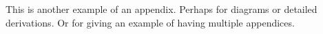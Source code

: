 This is another example of an appendix.
Perhaps for diagrams or detailed derivations.
Or for giving an example of having multiple appendices.

